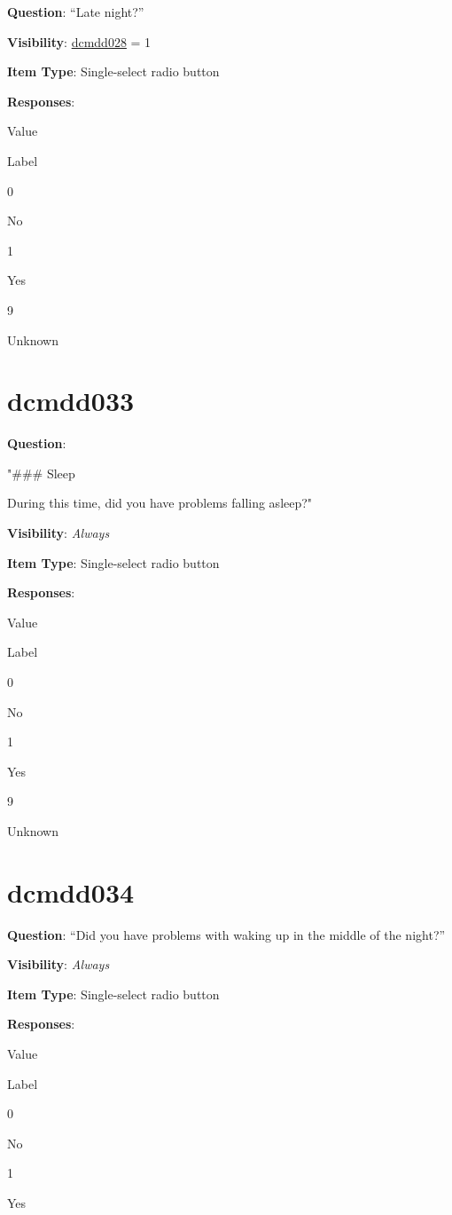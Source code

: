 \documentclass[
]{book}
\begin{document}
\textbf{Question}: ``Late night?''

\textbf{Visibility}: \protect\hyperlink{dcmdd028}{dcmdd028} = 1

\textbf{Item Type}: Single-select radio button

\textbf{Responses}:

Value

Label

0

No

1

Yes

9

Unknown

\hypertarget{dcmdd033}{%
\section{dcmdd033}\label{dcmdd033}}

\textbf{Question}:

"\#\#\# Sleep

During this time, did you have problems falling asleep?"

\textbf{Visibility}: \emph{Always}

\textbf{Item Type}: Single-select radio button

\textbf{Responses}:

Value

Label

0

No

1

Yes

9

Unknown

\hypertarget{dcmdd034}{%
\section{dcmdd034}\label{dcmdd034}}

\textbf{Question}: ``Did you have problems with waking up in the middle of the night?''

\textbf{Visibility}: \emph{Always}

\textbf{Item Type}: Single-select radio button

\textbf{Responses}:

Value

Label

0

No

1

Yes
\end{document}
